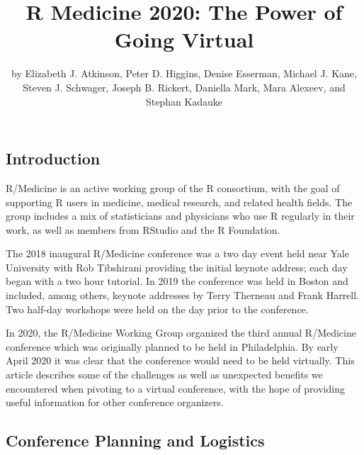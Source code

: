 \title{R Medicine 2020: The Power of Going Virtual}
\author{by Elizabeth J. Atkinson, Peter D. Higgins, Denise Esserman, Michael J. Kane, Steven J. Schwager, Joseph B. Rickert, Daniella Mark, Mara Alexeev, and Stephan Kadauke}

\maketitle


\hypertarget{introduction}{%
\subsection{Introduction}\label{introduction}}

R/Medicine is an active working group of the R consortium, with the goal of supporting R users in medicine, medical research, and related health fields. The group includes a mix of statisticians and physicians who use R regularly in their work, as well as members from RStudio and the R Foundation.

The 2018 inaugural R/Medicine conference was a two day event held near Yale University with Rob Tibshirani providing the initial keynote address; each day began with a two hour tutorial. In 2019 the conference was held in Boston and included, among others, keynote addresses by Terry Therneau and Frank Harrell. Two half-day workshops were held on the day prior to the conference.

In 2020, the R/Medicine Working Group organized the third annual R/Medicine conference which was originally planned to be held in Philadelphia. By early April 2020 it was clear that the conference would need to be held virtually. This article describes some of the challenges as well as unexpected benefits we encountered when pivoting to a virtual conference, with the hope of providing useful information for other conference organizers.

\hypertarget{conference-planning-and-logistics}{%
\subsection{Conference Planning and Logistics}\label{conference-planning-and-logistics}}

